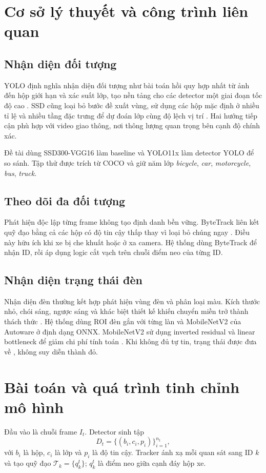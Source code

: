 \documentclass[11pt,a4paper]{article}
\newcommand{\code}[1]{{\small\texttt{\detokenize{#1}}}}
\begin{document}
\section{Cơ sở lý thuyết và công trình liên quan}
\subsection{Nhận diện đối tượng}
YOLO định nghĩa nhận diện đối tượng như bài toán hồi quy hợp nhất từ ảnh đến hộp giới hạn và xác suất lớp, tạo nền tảng cho các detector một giai đoạn tốc độ cao \citep{redmon2016}. SSD cũng loại bỏ bước đề xuất vùng, sử dụng các hộp mặc định ở nhiều tỉ lệ và nhiều tầng đặc trưng để dự đoán lớp cùng độ lệch vị trí \citep{liu2016}. Hai hướng tiếp cận phù hợp với video giao thông, nơi thông lượng quan trọng bên cạnh độ chính xác.

Đề tài dùng SSD300-VGG16 làm baseline và YOLO11x làm detector YOLO để so sánh. Tập thử được trích từ COCO \citep{lin2014} và giữ năm lớp \textit{bicycle}, \textit{car}, \textit{motorcycle}, \textit{bus}, \textit{truck}.

\subsection{Theo dõi đa đối tượng}
Phát hiện độc lập từng frame không tạo định danh bền vững. ByteTrack liên kết quỹ đạo bằng cả các hộp có độ tin cậy thấp thay vì loại bỏ chúng ngay \citep{zhang2022}. Điều này hữu ích khi xe bị che khuất hoặc ở xa camera. Hệ thống dùng ByteTrack để nhận ID, rồi áp dụng logic cắt vạch trên chuỗi điểm neo của từng ID.

\subsection{Nhận diện trạng thái đèn}
Nhận diện đèn thường kết hợp phát hiện vùng đèn và phân loại màu. Kích thước nhỏ, chói sáng, ngược sáng và khác biệt thiết kế khiến chuyển miền trở thành thách thức \citep{pon2023}. Hệ thống dùng ROI đèn gắn với từng làn và MobileNetV2 của Autoware ở định dạng ONNX. MobileNetV2 sử dụng inverted residual và linear bottleneck để giảm chi phí tính toán \citep{sandler2018}. Khi không đủ tự tin, trạng thái được đưa về \code{UNKNOWN}, không suy diễn thành đỏ.

\section{Bài toán và quá trình tinh chỉnh mô hình}
Đầu vào là chuỗi frame $I_t$. Detector sinh tập
\begin{equation}
D_t=\{(b_i,c_i,p_i)\}_{i=1}^{n_t},
\end{equation}
với $b_i$ là hộp, $c_i$ là lớp và $p_i$ là độ tin cậy. Tracker ánh xạ mỗi quan sát sang ID $k$ và tạo quỹ đạo $\mathcal{T}_k=\{q_k^t\}$; $q_k^t$ là điểm neo giữa cạnh đáy hộp xe.
\end{document}
